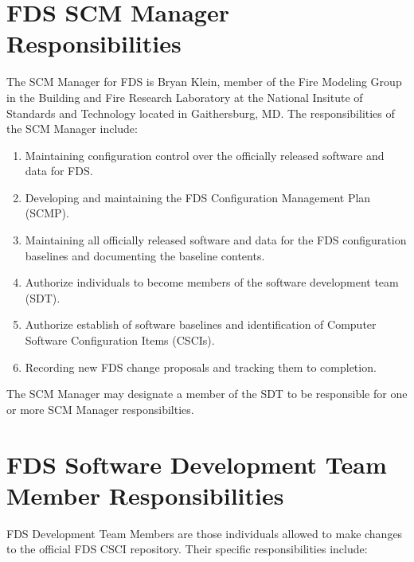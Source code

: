 \documentclass[11pt]{book}
\begin{document}
\section{FDS SCM Manager Responsibilities}

The SCM Manager for FDS is Bryan Klein, member of the Fire Modeling Group in the Building and Fire Research
Laboratory at the National Insitute of Standards and Technology located in Gaithersburg, MD.  The responsibilities
of the SCM Manager include:

\begin{enumerate}

\item Maintaining configuration control over the officially released software and data for FDS.

\item Developing and maintaining the FDS Configuration Management Plan (SCMP).

\item Maintaining all officially released software and data for the FDS configuration baselines and documenting
the baseline contents.

\item Authorize individuals to become members of the software development team (SDT).

\item Authorize establish of software baselines and identification of Computer Software Configuration Items (CSCIs).

\item Recording new FDS change proposals and tracking them to completion.

\end{enumerate}


The SCM Manager may designate a member of the SDT to be responsible for one or more SCM Manager responsibilties.

\section{FDS Software Development Team Member Responsibilities}

FDS Development Team Members are those individuals allowed to make changes to the official FDS CSCI repository.
Their specific responsibilities include:
\end{document}

